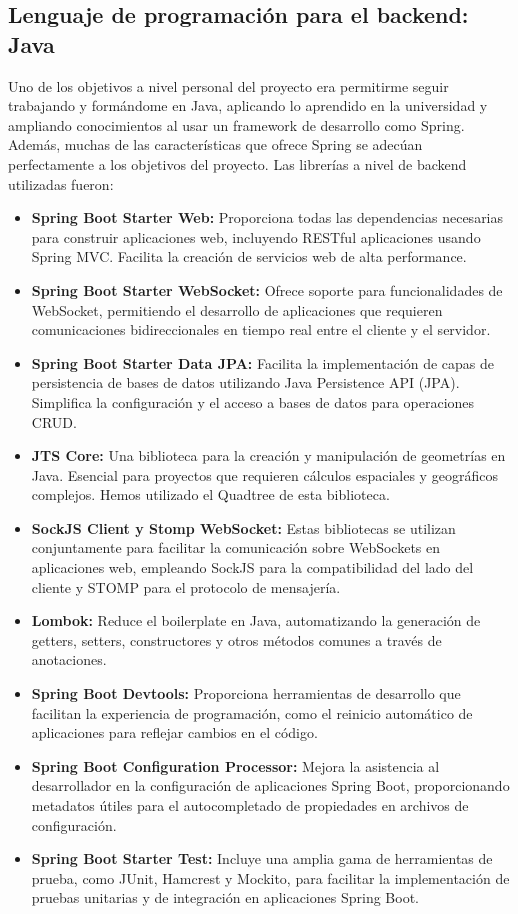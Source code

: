 \subsection{Lenguaje de programación para el backend: Java}
 Uno de los objetivos a nivel personal del proyecto era permitirme seguir trabajando y formándome en Java, aplicando lo aprendido en la universidad y ampliando conocimientos al usar un framework de desarrollo como Spring. Además, muchas de las características que ofrece Spring se adecúan perfectamente a los objetivos del proyecto. Las librerías a nivel de backend utilizadas fueron:
\begin{itemize}
    \item \textbf{Spring Boot Starter Web:}\cite{SpringBootWeb} Proporciona todas las dependencias necesarias para construir aplicaciones web, incluyendo RESTful aplicaciones usando Spring MVC. Facilita la creación de servicios web de alta performance.
    \item \textbf{Spring Boot Starter WebSocket:}\cite{SpringBootWebSocket} Ofrece soporte para funcionalidades de WebSocket, permitiendo el desarrollo de aplicaciones que requieren comunicaciones bidireccionales en tiempo real entre el cliente y el servidor.
    \item \textbf{Spring Boot Starter Data JPA:}\cite{SpringBootDataJPA} Facilita la implementación de capas de persistencia de bases de datos utilizando Java Persistence API (JPA). Simplifica la configuración y el acceso a bases de datos para operaciones CRUD.
    \item \textbf{JTS Core:}\cite{JTSCore} Una biblioteca para la creación y manipulación de geometrías en Java. Esencial para proyectos que requieren cálculos espaciales y geográficos complejos. Hemos utilizado el Quadtree de esta biblioteca.
    \item \textbf{SockJS Client y Stomp WebSocket:}\cite{SockJS}\cite{StompWebSocket} Estas bibliotecas se utilizan conjuntamente para facilitar la comunicación sobre WebSockets en aplicaciones web, empleando SockJS para la compatibilidad del lado del cliente y STOMP para el protocolo de mensajería.
    \item \textbf{Lombok:}\cite{Lombok} Reduce el boilerplate en Java, automatizando la generación de getters, setters, constructores y otros métodos comunes a través de anotaciones.
    \item \textbf{Spring Boot Devtools:}\cite{SpringBootDevtools} Proporciona herramientas de desarrollo que facilitan la experiencia de programación, como el reinicio automático de aplicaciones para reflejar cambios en el código.
    \item \textbf{Spring Boot Configuration Processor:}\cite{SpringBootConfigProcessor} Mejora la asistencia al desarrollador en la configuración de aplicaciones Spring Boot, proporcionando metadatos útiles para el autocompletado de propiedades en archivos de configuración.
    \item \textbf{Spring Boot Starter Test:}\cite{SpringBootStarterTest} Incluye una amplia gama de herramientas de prueba, como JUnit, Hamcrest y Mockito, para facilitar la implementación de pruebas unitarias y de integración en aplicaciones Spring Boot.
\end{itemize}

